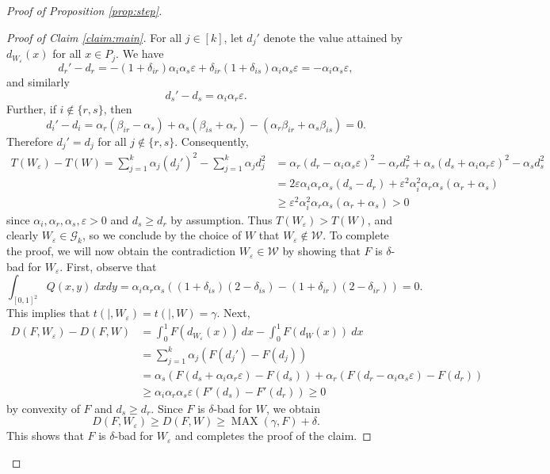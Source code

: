 \documentclass[11pt]{article}
\theoremstyle{definition}
\newcommand{\eps}{\varepsilon}
\begin{document}
\begin{proof}[Proof of Proposition \ref{prop:step}]
\begin{proof}[Proof of Claim \ref{claim:main}]
        For all $j \in [k]$, let $d_j'$ denote the value attained by $d_{W_{\varepsilon}} (x)$ for all $x \in P_j$.  We have
        \[d_r' - d_r = -(1 + \delta_{ir}) \alpha_i \alpha_s \eps + \delta_{ir} (1 + \delta_{is}) \alpha_i \alpha_s \eps = - \alpha_i \alpha_s \eps, \] and similarly \[ d_s' - d_s = \alpha_i  \alpha_r \eps. \]
        Further, if $i \not\in\{r,s\}$, then
        \[d_i'-d_i=\alpha_r(\beta_{ir}-\alpha_s)+\alpha_s(\beta_{is}+\alpha_r) - (\alpha_r\beta_{ir} +\alpha_s\beta_{is})=0.\]
        Therefore $d_j' = d_j$  for all $j \notin \{r,s\}$. Consequently,
        \begin{align*}
            T(W_{\varepsilon}) - T(W) =   \sum_{j = 1}^k \alpha_j (d_j')^2 - \sum_{j = 1}^k \alpha_j d_j^2 &= \alpha_r (d_r - \alpha_i \alpha_s \eps)^2 - \alpha_r d_r^2 + \alpha_s (d_s + \alpha_i \alpha_r \eps)^2 - \alpha_s d_s^2 \\
            &= 2 \eps\alpha_i \alpha_r \alpha_s (d_s - d_r) + \eps^2 \alpha_i^2\alpha_r \alpha_s(\alpha_r+\alpha_s) \\
            &\ge \eps^2 \alpha_i^2\alpha_r \alpha_s(\alpha_r+\alpha_s) >0
        \end{align*} since $\alpha_i, \alpha_r, \alpha_s, \eps > 0$ and $d_s \ge d_r$ by assumption. Thus $T(W_{\varepsilon}) > T(W)$, and clearly $W_{\eps} \in \mathcal G_k$, so we conclude by the choice of $W$ that $W_{\eps} \not\in \mathcal W$.
        To complete the proof, we will now obtain the contradiction $W_{\eps} \in \mathcal W$ by showing that $F$ is $\delta$-bad for $W_{\eps}$. 
        First, observe that  \[ \int_{[0,1]^2} Q (x,y) ~dx dy = \alpha_i \alpha_r \alpha_s ((1 + \delta_{is}) (2 - \delta_{is}) - (1 + \delta_{ir}) (2 - \delta_{ir})) = 0. \] This implies that $t (|, W_{\varepsilon}) = t (|, W) = \gamma$. Next,
        \begin{align*}
            D(F, W_\varepsilon) - D(F, W) &= \int_0^1 F (d_{W_{\varepsilon}} (x)) ~ dx  - \int_0^1 F (d_{W} (x)) ~ dx \\
            &= \sum_{j = 1}^k \alpha_j (F (d_j') - F (d_j)) \\
            &= \alpha_s (F (d_s + \alpha_i \alpha_r \eps) - F (d_s)) + \alpha_r (F (d_r - \alpha_i \alpha_s \eps) - F (d_r)) \\
            &\ge \alpha_i \alpha_r \alpha_s \eps (F' (d_s) - F' (d_r)) \ge 0
        \end{align*} by convexity of $F$ and  $d_s \ge d_r$.
        Since $F$ is $\delta$-bad for $W$, we obtain 
        \[D(F, W_\varepsilon) \ge D(F, W) \geq \operatorname{MAX} (\gamma, F) + \delta.\]
        This shows that $F$ is $\delta$-bad for $W_\eps$ and completes the proof of the claim.
    \end{proof}
  

\end{proof}
\end{document}
